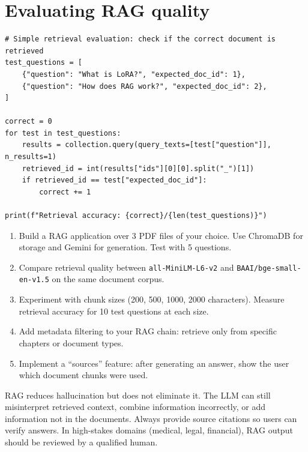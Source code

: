 \section{Evaluating RAG quality}

\begin{verbatim}
# Simple retrieval evaluation: check if the correct document is retrieved
test_questions = [
    {"question": "What is LoRA?", "expected_doc_id": 1},
    {"question": "How does RAG work?", "expected_doc_id": 2},
]

correct = 0
for test in test_questions:
    results = collection.query(query_texts=[test["question"]], n_results=1)
    retrieved_id = int(results["ids"][0][0].split("_")[1])
    if retrieved_id == test["expected_doc_id"]:
        correct += 1

print(f"Retrieval accuracy: {correct}/{len(test_questions)}")
\end{verbatim}

\begin{exercise}
\begin{enumerate}
  \item Build a RAG application over 3 PDF files of your choice. Use ChromaDB for storage and Gemini for generation. Test with 5 questions.
  \item Compare retrieval quality between \texttt{all-MiniLM-L6-v2} and \texttt{BAAI/bge-small-en-v1.5} on the same document corpus.
  \item Experiment with chunk sizes (200, 500, 1000, 2000 characters). Measure retrieval accuracy for 10 test questions at each size.
  \item Add metadata filtering to your RAG chain: retrieve only from specific chapters or document types.
  \item Implement a ``sources'' feature: after generating an answer, show the user which document chunks were used.
\end{enumerate}
\end{exercise}

\begin{ethicsbox}
RAG reduces hallucination but does not eliminate it. The LLM can still misinterpret retrieved context, combine information incorrectly, or add information not in the documents. Always provide source citations so users can verify answers. In high-stakes domains (medical, legal, financial), RAG output should be reviewed by a qualified human.
\end{ethicsbox}

